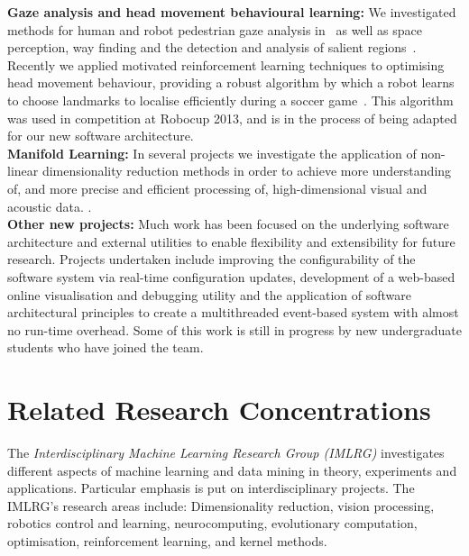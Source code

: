 \documentclass{llncs}
\begin{document}
\noindent\textbf{Gaze analysis and head movement behavioural learning:} We investigated methods for human and robot pedestrian gaze analysis in~\cite{JalalianEtAl_CAADRIA2011,WongEtAl2012} as well as space perception, way finding and the detection and analysis of salient regions~\cite{BhatiaChalup2013,BhatiaEtAl2013,BhatiaChalupOstwald2013}. Recently we  applied motivated reinforcement learning techniques to optimising head movement behaviour, providing a robust algorithm by which a robot learns to choose landmarks to localise efficiently during a soccer game~\cite{FountainEtAl2014}. This algorithm was used in competition at Robocup 2013, and is in the process of being adapted for our new software architecture.
\\

\noindent\textbf{Manifold Learning:} In several projects we
investigate the application of non-linear dimensionality reduction
methods in order to achieve more understanding of, and more precise
and efficient processing of, high-dimensional visual and acoustic data.
\cite{ChalupEtAl2007b,WongChalup_WCCI_2008,WongEtAl2012}.%
\\

\noindent\textbf{Other new projects:} Much work has been focused on the underlying software architecture and external utilities to enable flexibility and extensibility for future research. Projects undertaken include improving the configurability of the software system via real-time configuration updates, development of a web-based online visualisation and debugging utility \cite{AnnableEtAl2014} and the application of software architectural principles to create a multithreaded event-based system with almost no run-time overhead. Some of this work is still in progress by new undergraduate students who have joined the team.

\section{Related Research Concentrations}

The \emph{Interdisciplinary Machine Learning Research Group (IMLRG)} investigates different aspects of machine learning and data mining in theory, experiments and applications. Particular emphasis is put on interdisciplinary projects. The IMLRG's research areas include: Dimensionality reduction, vision processing, robotics control and learning, neurocomputing, evolutionary computation, optimisation, reinforcement learning, and kernel methods.
\end{document}
